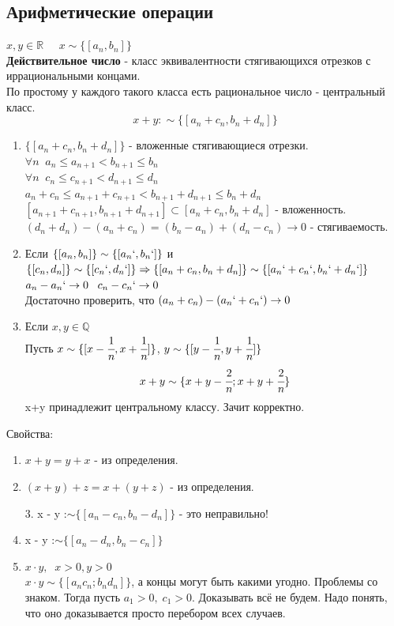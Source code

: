 \documentclass[12pt, paper]{article}
\newcommand{\Q}{\mathbb{Q}}
\newcommand{\R}{\mathbb{R}}
\begin{document}
\subsection{Арифметические операции}
$x, y\in \R\;\;\;\;\; x \sim \{[a_n,b_n]\}$\\
\textbf{Действительное число} - класс эквивалентности стягивающихся отрезков с иррациональными концами.\\
По простому у каждого такого класса есть рациональное число - центральный класс. \\
\[x + y :\sim \{[a_n+c_n,b_n+d_n]\} \]
\begin{tcolorbox}[title=Определим операцию сложения]
    \begin{enumerate}
        \item $\{[a_n+c_n,b_n+d_n]\}$ - вложенные стягивающиеся отрезки.
        $\forall n\;\; a_n\leq a_{n+1} < b_{n+1} \leq b_n$\\
        $\forall n\;\; c_n\leq c_{n+1} < d_{n+1} \leq d_n$\\
        $a_n+c_n\leq a_{n+1} + c_{n+1} < b_{n+1} + d_{n+1} \leq b_n + d_n$\\
        $[a_{n+1}+c_{n+1},b_{n+1}+d_{n+1}] \subset [a_n+c_n,b_n+d_n]$ - вложенность.\\
        $(d_n+d_n) - (a_n+c_n) = (b_n - a_n) + (d_n - c_n) \to 0$ - стягиваемость.
        \item Если $\{[a_n,b_n]\} \sim \{[a_n`,b_n`]\}$ и $\{[c_n,d_n]\} \sim \{[c_n`,d_n`]\} \Rightarrow \{[a_n+c_n,b_n+d_n]\} \sim \{[a_n`+c_n`,b_n`+d_n`]\}$\\
        $a_n - a_n` \to 0 \;\;\; c_n-c_n` \to 0$\\
        Достаточно проверить, что $(a_n + c_n) - (a_n` + c_n`) \to 0$
        \item Если $x,y \in \Q$\\
        Пусть $x \sim \{ [x-\cfrac{1}{n}, x+\cfrac{1}{n}] \}$, $y \sim \{ [y-\cfrac{1}{n}, y+\cfrac{1}{n}] \}$\\
        \[ x+y \sim \{x+y-\cfrac{2}{n};x+y+\cfrac{2}{n}\} \]
        x+y принадлежит центральному классу. Зачит корректно.
    \end{enumerate}
\end{tcolorbox}
Свойства:
\begin{enumerate}
    \item $ x + y = y + x $ - из определения.
    \item $ (x + y) + z = x + (y + z) $ - из определения.
    \item[3.] x - y :$\sim \{[a_n-c_n, b_n-d_n]\}$ - это неправильно!
    \item x - y :$\sim \{[a_n-d_n, b_n-c_n]\}$
    \item $x\cdot y,\;\;x>0,y>0$\\
    $x\cdot y \sim \{[a_nc_n;b_nd_n]\}$, а концы могут быть какими угодно. Проблемы со знаком. Тогда пусть $a_1>0,\;c_1>0$. Доказывать всё не будем. Надо понять, что оно доказывается просто перебором всех случаев.
\end{enumerate}
\end{document}
